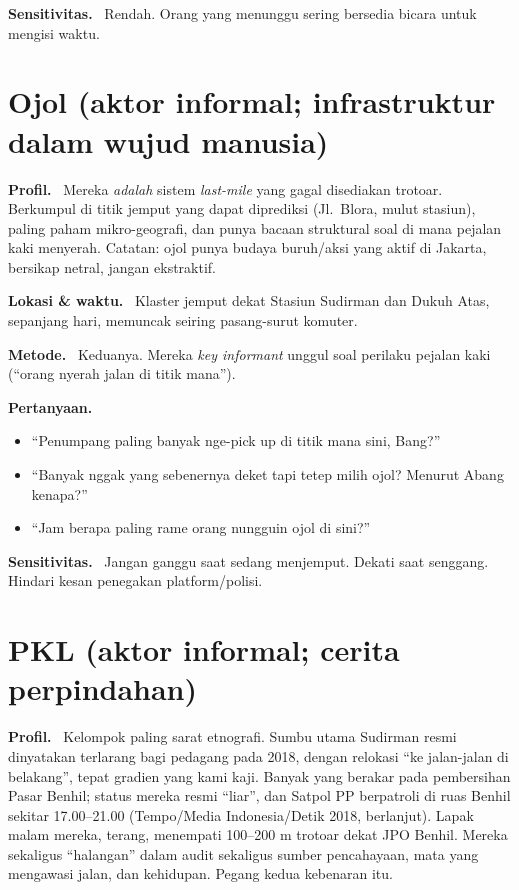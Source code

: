 \documentclass[11pt,a4paper]{report}
\newcommand{\fld}[1]{\smallskip\noindent\textbf{#1.}\ }
\begin{document}
\fld{Sensitivitas} Rendah. Orang yang menunggu sering bersedia bicara untuk mengisi waktu.

\section{Ojol \textnormal{(aktor informal; infrastruktur dalam wujud manusia)}}
\fld{Profil} Mereka \emph{adalah} sistem \emph{last-mile} yang gagal disediakan trotoar.
Berkumpul di titik jemput yang dapat diprediksi (Jl.\ Blora, mulut stasiun), paling
paham mikro-geografi, dan punya bacaan struktural soal di mana pejalan kaki menyerah.
Catatan: ojol punya budaya buruh/aksi yang aktif di Jakarta, bersikap netral, jangan
ekstraktif.

\fld{Lokasi \& waktu} Klaster jemput dekat Stasiun Sudirman dan Dukuh Atas, sepanjang
hari, memuncak seiring pasang-surut komuter.

\fld{Metode} Keduanya. Mereka \emph{key informant} unggul soal perilaku pejalan kaki
(``orang nyerah jalan di titik mana'').

\fld{Pertanyaan}
\begin{itemize}
  \item ``Penumpang paling banyak nge-pick up di titik mana sini, Bang?''
  \item ``Banyak nggak yang sebenernya deket tapi tetep milih ojol? Menurut Abang kenapa?''
  \item ``Jam berapa paling rame orang nungguin ojol di sini?''
\end{itemize}

\fld{Sensitivitas} Jangan ganggu saat sedang menjemput. Dekati saat senggang. Hindari
kesan penegakan platform/polisi.

\section{PKL \textnormal{(aktor informal; cerita perpindahan)}}
\fld{Profil} Kelompok paling sarat etnografi. Sumbu utama Sudirman resmi dinyatakan
terlarang bagi pedagang pada 2018, dengan relokasi ``ke jalan-jalan di belakang'',
tepat gradien yang kami kaji. Banyak yang berakar pada pembersihan Pasar Benhil;
status mereka resmi ``liar'', dan Satpol PP berpatroli di ruas Benhil sekitar
17.00--21.00 (Tempo/Media Indonesia/Detik 2018, berlanjut). Lapak malam mereka, terang,
menempati 100--200 m trotoar dekat JPO Benhil. Mereka sekaligus ``halangan'' dalam
audit sekaligus sumber pencahayaan, mata yang mengawasi jalan, dan kehidupan. Pegang
kedua kebenaran itu.
\end{document}
